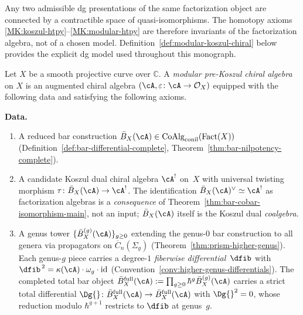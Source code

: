 \begin{remark}\label{rem:model-independence}
Any two admissible dg presentations of the same factorization
object are connected by a contractible space of quasi-isomorphisms.
The homotopy axioms \ref{MK:koszul-htpy}--\ref{MK:modular-htpy}
are therefore invariants of the factorization algebra, not of a
chosen model.  Definition~\ref{def:modular-koszul-chiral} below provides
the explicit dg model used throughout this monograph.
\end{remark}

\begin{definition}\label{def:modular-koszul-chiral}
Let $X$ be a smooth projective curve over $\mathbb{C}$.
A \emph{modular pre-Koszul chiral algebra} on $X$ is an augmented chiral
algebra $(\cA, \varepsilon\colon \cA \to \mathcal{O}_X)$ equipped with
the following data and satisfying the following axioms.

\smallskip\noindent\textbf{Data.}
\begin{enumerate}[label=\textup{(D\arabic*)}]
\item\label{D:bar}
A reduced bar construction
$\bar{B}_X(\cA) \in \operatorname{CoAlg}_{\mathrm{conil}}(\operatorname{Fact}(X))$
(Definition~\ref{def:bar-differential-complete},
Theorem~\ref{thm:bar-nilpotency-complete}).

\item\label{D:dual}
A candidate Koszul dual chiral algebra $\cA^!$ on~$X$ with
universal twisting morphism
$\tau\colon \bar{B}_X(\cA) \to \cA^!$.  The identification
$\bar{B}_X(\cA)^\vee \simeq \cA^!$ as factorization algebras is a
\emph{consequence} of Theorem~\ref{thm:bar-cobar-isomorphism-main},
not an input; $\bar{B}_X(\cA)$ itself is the Koszul dual \emph{coalgebra}.

\item\label{D:genus-tower}
A genus tower $\{\bar{B}^{(g)}_X(\cA)\}_{g \geq 0}$ extending the
genus-$0$ bar construction to all genera via propagators on
$\overline{C}_n(\Sigma_g)$
(Theorem~\ref{thm:prism-higher-genus}).
Each genus-$g$ piece carries a degree-$1$ \emph{fiberwise
differential}~$\dfib$ with
$\dfib^{\,2} = \kappa(\cA) \cdot \omega_g \cdot \operatorname{id}$
(Convention~\ref{conv:higher-genus-differentials}).
The completed total bar object
$\bar{B}^{\mathrm{full}}_X(\cA) :=
\prod_{g \geq 0} \hbar^g \bar{B}^{(g)}_X(\cA)$
carries a strict total differential $\Dg{} \colon
\bar{B}^{\mathrm{full}}_X(\cA) \to \bar{B}^{\mathrm{full}}_X(\cA)$
with $\Dg{}^2 = 0$, whose reduction modulo $\hbar^{g+1}$ restricts
to $\dfib$ at genus~$g$.


\end{enumerate}
\end{definition}
